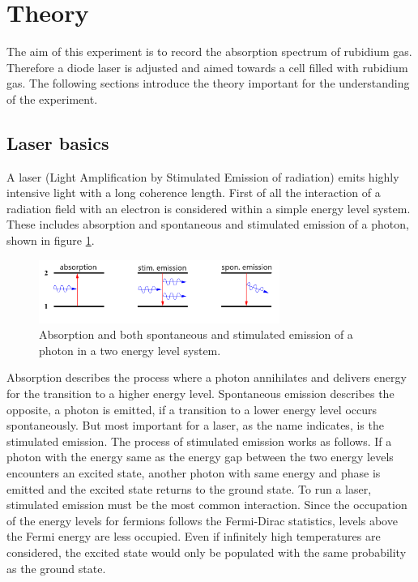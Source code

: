 \section{Theory}
\label{sec:theory}
The aim of this experiment is to record the absorption spectrum
of rubidium gas. Therefore a diode laser is adjusted and aimed towards a cell
filled with rubidium gas.
The following sections introduce the theory
important for the understanding of the experiment.

\subsection{Laser basics}
\label{subsec:laser}
A laser (Light Amplification by Stimulated Emission of radiation)
emits highly intensive light with a long coherence length.
First of all the interaction of a radiation field with
an electron is considered within a simple energy level system.
These includes absorption and spontaneous and stimulated emission
of a photon, shown in figure \ref{fig:ab_em}.
\begin{figure}
\centering
\includegraphics[width=0.7\textwidth]{ab_und_emiss.png}
\caption{Absorption and both spontaneous and stimulated emission of a photon in a two energy level system.
\cite{V61}}
\label{fig:ab_em}
\end{figure}
Absorption describes the process where a photon annihilates and
delivers energy for the transition
to a higher energy level.
Spontaneous emission describes the opposite, a photon is
emitted, if a transition to a lower energy
level occurs spontaneously.
But most important for a laser, as the name indicates,
is the stimulated emission.
The process of stimulated emission works as follows.
If a photon with the energy same as
the energy gap between the two energy levels
encounters an excited state, another photon with
same energy and phase is emitted and the excited state
returns to the ground state.
To run a laser, stimulated emission must be the most common interaction.
Since the occupation of the energy levels for fermions follows
the Fermi-Dirac statistics, %
levels above the Fermi energy are
less occupied. Even if infinitely high temperatures are considered,
the excited state would only be populated with the same probability as the ground state.  %
